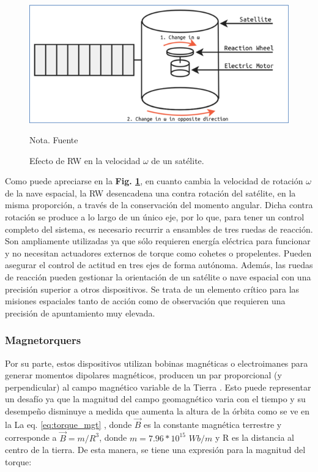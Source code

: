 \begin{figure}[!ht]
	\begin{center}
		\includegraphics[scale=0.9]{imagenes/marco_teorico/rw.PNG}\\
	\end{center}
	\caption{ Efecto de RW en la velocidad $\omega$ de un satélite.}
	\label{fig:rw_diagram}
	\footnotesize{Nota. Fuente \cite{opc:Charles2019}}
\end{figure}

Como puede apreciarse en la \textbf{Fig. \ref{fig:rw_diagram}}, en cuanto cambia la velocidad de rotación $\omega$ de la nave espacial, la RW desencadena una contra rotación del satélite, en la misma proporción, a través de la conservación del momento angular. Dicha contra rotación se produce a lo largo de un único eje, por lo que, para tener un control completo del sistema, es necesario recurrir a ensambles de tres ruedas de reacción.
Son ampliamente utilizadas ya que sólo requieren energía eléctrica para funcionar y no necesitan actuadores externos de torque como cohetes o propelentes. Pueden asegurar el control de actitud en tres ejes de forma autónoma. Además, las ruedas de reacción pueden gestionar la orientación de un satélite o nave espacial con una precisión superior a otros dispositivos. Se trata de un elemento crítico para las misiones espaciales tanto de acción como de observación que requieren una precisión de apuntamiento muy elevada.

\subsubsection{Magnetorquers}

Por su parte, estos dispositivos utilizan bobinas magnéticas o electroimanes para generar momentos dipolares magnéticos, producen un par proporcional (y perpendicular) al campo magnético variable de la Tierra \cite{Rycroft1997}. Esto puede representar un desafío ya que la magnitud del campo geomagnético varia con el tiempo y su desempeño disminuye a medida que aumenta la altura de la órbita como se ve en la La eq. \ref{eq:torque_mgt} , donde $\vec{B}$ es la constante magnética terrestre y corresponde a $ \vec{B}=m/R^3$, donde $m = 7.96*10^{15}$    $Wb/m$   y R es la distancia al centro de la tierra. De esta manera, se tiene una expresión para la magnitud del torque: 

